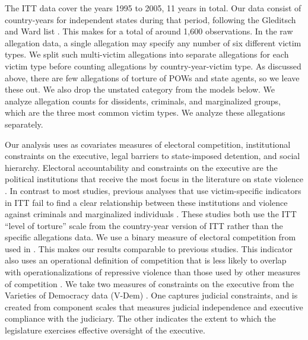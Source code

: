 \documentclass[11pt]{article}
\begin{document}
The ITT data cover the years 1995 to 2005, 11 years in total. Our data consist of country-years for independent states during that period, following the Gleditsch and Ward list \citep{gleditsch:ward:1999}. This makes for a total of around 1,600 observations. In the raw allegation data, a single allegation may specify any number of six different victim types. We split such multi-victim allegations into separate allegations for each victim type before counting allegations by country-year-victim type. As discussed above, there are few allegations of torture of POWs and state agents, so we leave these out. We also drop the unstated category from the models below. We analyze allegation counts for dissidents, criminals, and marginalized groups, which are the three most common victim types. We analyze these allegations separately. 

Our analysis uses as covariates measures of electoral competition, institutional constraints on the executive, legal barriers to state-imposed detention, and social hierarchy. Electoral accountability and constraints on the executive are the political institutions that receive the most focus in the literature on state violence \citep[E.g.,][]{Davenport2007}. In contrast to most studies, previous analyses that use victim-specific indicators in ITT fail to find a clear relationship between these institutions and violence against criminals and marginalized individuals \citep{Haschke2018,JacksonHillHall2018}. These studies both use the ITT ``level of torture'' scale from the country-year version of ITT \citep{conrad2013disaggregating} rather than the specific allegations data. We use a binary measure of electoral competition from \citet{cheibub2010democracy} used in \citet{Haschke2018,JacksonHillHall2018}. This makes our results comparable to previous studies. This indicator also uses an operational definition of competition that is less likely to overlap with operationalizations of repressive violence than those used by other measures of competition \citep[See][]{Hill2016}. We take two measures of constraints on the executive from the Varieties of Democracy data (V-Dem) \citep{Vdem}. One captures judicial constraints, and is created from component scales that measures judicial independence and executive compliance with the judiciary. The other indicates the extent to which the legislature exercises effective oversight of the executive. 
\end{document}

